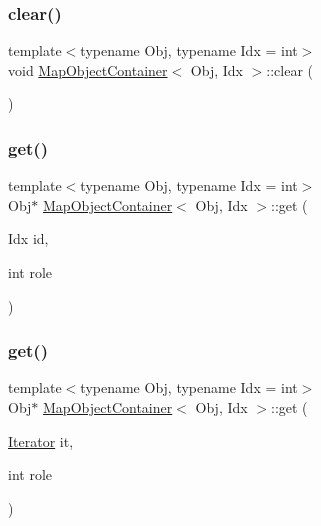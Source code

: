 \subsubsection{\texorpdfstring{clear()}{clear()}}
{\footnotesize\ttfamily template$<$typename Obj, typename Idx = int$>$ \\
void \mbox{\hyperlink{class_map_object_container}{Map\+Object\+Container}}$<$ Obj, Idx $>$\+::clear (\begin{DoxyParamCaption}{ }\end{DoxyParamCaption})\hspace{0.3cm}{\ttfamily [inline]}}

\mbox{\label{class_map_object_container_a15a898aa8fe3452a85ad0a82ca5558db}} 
\subsubsection{\texorpdfstring{get()}{get()}\hspace{0.1cm}{\footnotesize\ttfamily [1/2]}}
{\footnotesize\ttfamily template$<$typename Obj, typename Idx = int$>$ \\
Obj$\ast$ \mbox{\hyperlink{class_map_object_container}{Map\+Object\+Container}}$<$ Obj, Idx $>$\+::get (\begin{DoxyParamCaption}\item[{Idx}]{id,  }\item[{int}]{role }\end{DoxyParamCaption})\hspace{0.3cm}{\ttfamily [inline]}}

\mbox{\label{class_map_object_container_a53de9537128d7697e3ee0835f9b52201}} 
\subsubsection{\texorpdfstring{get()}{get()}\hspace{0.1cm}{\footnotesize\ttfamily [2/2]}}
{\footnotesize\ttfamily template$<$typename Obj, typename Idx = int$>$ \\
Obj$\ast$ \mbox{\hyperlink{class_map_object_container}{Map\+Object\+Container}}$<$ Obj, Idx $>$\+::get (\begin{DoxyParamCaption}\item[{\mbox{\hyperlink{class_map_object_container_a744f6940937741a8ffd125e146dc86ab}{Iterator}}}]{it,  }\item[{int}]{role }\end{DoxyParamCaption})\hspace{0.3cm}{\ttfamily [inline]}}

